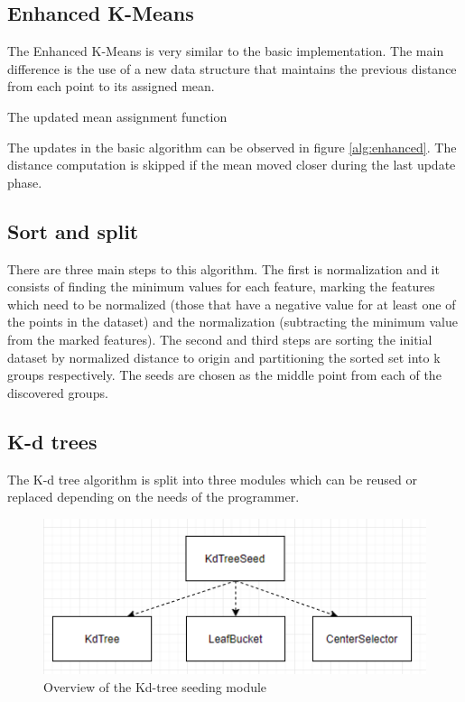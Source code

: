 \documentclass[12pt]{article}
\begin{document}
	\subsection{Enhanced K-Means}
	
	The Enhanced K-Means is very similar to the basic implementation. The main difference is the use of a new data structure that maintains the previous distance from each point to its assigned mean.
	
	\begin{algorithm}[h]
		\caption{The updated mean assignment function}
		\label{alg:enhanced}
	\end{algorithm}

	The updates in the basic algorithm can be observed in figure \ref{alg:enhanced}. The distance computation is skipped if the mean moved closer during the last update phase.
	
	\subsection{Sort and split}
	
	There are three main steps to this algorithm. The first is normalization and it consists of finding the minimum values for each feature, marking the features which need to be normalized (those that have a negative value for at least one of the points in the dataset) and the normalization (subtracting the minimum value from the marked features). The second and third steps are sorting the initial dataset by normalized distance to origin and partitioning the sorted set into k groups respectively. The seeds are chosen as the middle point from each of the discovered groups.
	
	\subsection{K-d trees}
	The K-d tree algorithm is split into three modules which can be reused or replaced depending on the needs of the programmer. 
	
	\begin{figure}[h]
		\centering
		\includegraphics{resources/KdTree.png}
		\caption{Overview of the Kd-tree seeding module}
		\label{fig:kdtree}
	\end{figure}
	
\end{document}
